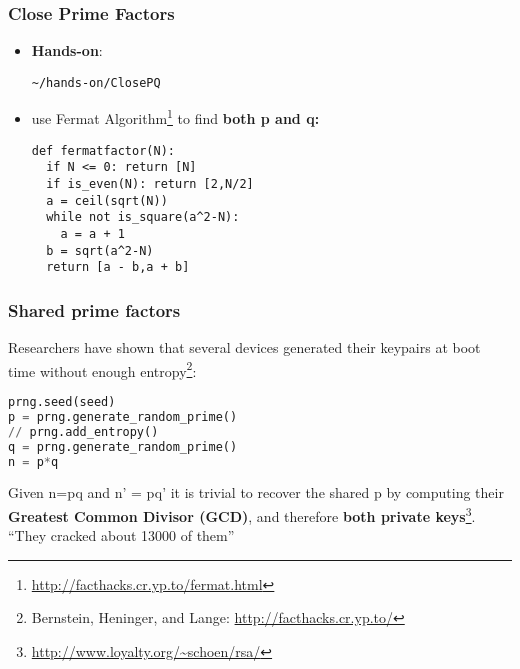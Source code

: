 \begin{frame}[fragile]
  \frametitle{Close Prime Factors}
  \begin{itemize}
\item {\bf Hands-on}:

\begin{lstlisting}
~/hands-on/ClosePQ
\end{lstlisting}

   \item use Fermat Algorithm\footnote{\url{http://facthacks.cr.yp.to/fermat.html}} to find {\bf both p and q:}

\begin{lstlisting}[basicstyle=\tiny]
def fermatfactor(N):
  if N <= 0: return [N]
  if is_even(N): return [2,N/2]
  a = ceil(sqrt(N))
  while not is_square(a^2-N):
    a = a + 1
  b = sqrt(a^2-N)
  return [a - b,a + b]
\end{lstlisting}

  \end{itemize}
 
\end{frame}

\begin{frame}[fragile]
  \frametitle{Shared prime factors}
     Researchers have shown that several devices generated their keypairs
   at boot time without enough entropy\footnote{Bernstein, Heninger, and Lange: \url{http://facthacks.cr.yp.to/}}:
   
\begin{lstlisting}[language=python, basicstyle=\tiny]
prng.seed(seed)
p = prng.generate_random_prime()
// prng.add_entropy()
q = prng.generate_random_prime()
n = p*q
\end{lstlisting}

Given n=pq and n' = pq' it is trivial to recover the shared p by computing their
{\bf Greatest Common Divisor (GCD)}, and therefore {\bf both private
  keys}\footnote{\url{http://www.loyalty.org/~schoen/rsa/}}.\\
\vspace{5mm}
``They cracked about 13000 of them''
\end{frame}

